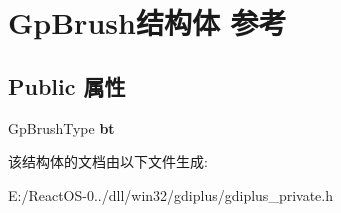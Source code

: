 \hypertarget{struct_gp_brush}{}\section{Gp\+Brush结构体 参考}
\label{struct_gp_brush}
\subsection*{Public 属性}
\begin{DoxyCompactItemize}
\item 
\mbox{\label{struct_gp_brush_acf2a70ee1d038a0190d59ce62ed01538}} 
Gp\+Brush\+Type {\bfseries bt}
\end{DoxyCompactItemize}


该结构体的文档由以下文件生成\+:\begin{DoxyCompactItemize}
\item 
E\+:/\+React\+O\+S-\/0../dll/win32/gdiplus/gdiplus\+\_\+private.\+h\end{DoxyCompactItemize}
